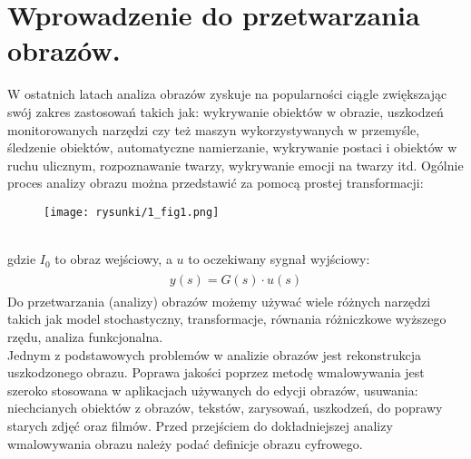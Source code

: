 \documentclass[12pt, twoside, openany]{report}
\theoremstyle{definition}
\begin{document}
\chapter{Wprowadzenie do przetwarzania obrazów.}
W ostatnich latach analiza obrazów zyskuje na popularności ciągle zwiększając swój zakres zastosowań takich jak: wykrywanie obiektów w obrazie, uszkodzeń monitorowanych narzędzi czy też maszyn wykorzystywanych w przemyśle, śledzenie obiektów, automatyczne namierzanie, wykrywanie postaci i obiektów w ruchu ulicznym, rozpoznawanie twarzy, wykrywanie emocji na twarzy itd.  Ogólnie proces analizy obrazu można przedstawić za pomocą prostej transformacji: \\
\begin{figure}[!h]
	\centering
	\texttt{[image: rysunki/1\_fig1.png]}
\end{figure}
\\
gdzie $I_0$ to obraz wejściowy, a $u$ to oczekiwany sygnał wyjściowy:
\begin{align}
\begin{aligned}
y(s) = G(s) \cdot u(s)
\end{aligned}
\end{align}
Do przetwarzania (analizy) obrazów możemy używać wiele różnych narzędzi takich jak model stochastyczny, transformacje, równania różniczkowe wyższego rzędu, analiza funkcjonalna. \\
Jednym z podstawowych problemów w analizie obrazów jest rekonstrukcja uszkodzonego obrazu. Poprawa jakości poprzez metodę wmalowywania jest szeroko stosowana w aplikacjach używanych do edycji obrazów, usuwania: niechcianych obiektów z obrazów, tekstów, zarysowań, uszkodzeń, do poprawy starych zdjęć oraz filmów. Przed przejściem do dokładniejszej analizy wmalowywania obrazu należy podać definicje obrazu cyfrowego.
\end{document}
